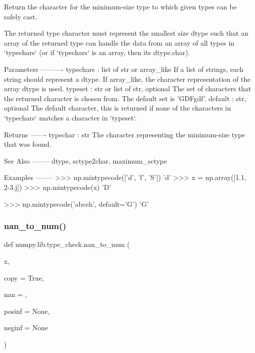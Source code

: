 \begin{DoxyVerb}Return the character for the minimum-size type to which given types can
be safely cast.

The returned type character must represent the smallest size dtype such
that an array of the returned type can handle the data from an array of
all types in `typechars` (or if `typechars` is an array, then its
dtype.char).

Parameters
----------
typechars : list of str or array_like
    If a list of strings, each string should represent a dtype.
    If array_like, the character representation of the array dtype is used.
typeset : str or list of str, optional
    The set of characters that the returned character is chosen from.
    The default set is 'GDFgdf'.
default : str, optional
    The default character, this is returned if none of the characters in
    `typechars` matches a character in `typeset`.

Returns
-------
typechar : str
    The character representing the minimum-size type that was found.

See Also
--------
dtype, sctype2char, maximum_sctype

Examples
--------
>>> np.mintypecode(['d', 'f', 'S'])
'd'
>>> x = np.array([1.1, 2-3.j])
>>> np.mintypecode(x)
'D'

>>> np.mintypecode('abceh', default='G')
'G'\end{DoxyVerb}
 \mbox{\label{namespacenumpy_1_1lib_1_1type__check_a05b555a98673209991832e412ec065e1}} 
\subsubsection{\texorpdfstring{nan\+\_\+to\+\_\+num()}{nan\_to\_num()}}
{\footnotesize\ttfamily def numpy.\+lib.\+type\+\_\+check.\+nan\+\_\+to\+\_\+num (\begin{DoxyParamCaption}\item[{}]{x,  }\item[{}]{copy = {\ttfamily True},  }\item[{}]{nan = {},  }\item[{}]{posinf = {\ttfamily None},  }\item[{}]{neginf = {\ttfamily None} }\end{DoxyParamCaption})}

